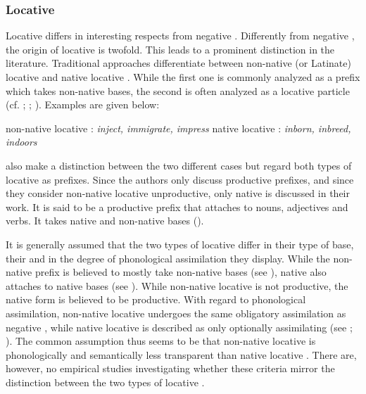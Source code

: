 \subsubsection{Locative } \label{locative in}

Locative  differs in interesting respects from negative . Differently from negative , the origin of locative  is twofold. This leads to a prominent distinction in the literature. Traditional approaches differentiate between non-native (or Latinate) locative  and native locative .  While the first one is commonly analyzed as a prefix which takes non-native bases, the second is often analyzed as a locative particle (cf. \citealt[497ff.]{Jespersen.1965}\mbox{;} \citealt[115, 163f.]{Marchand.1969}\mbox{;} \citealt[1685]{Bauer.2002}). Examples are given below:

\begin{exe}
	\ex non-native locative : \hspace{0.7cm} \textit{inject, immigrate, impress}
	\ex native locative : \hspace{1.4cm} \textit{inborn, inbreed, indoors}
\end{exe}

\cite{Bauer.2013} also make a distinction between the two different cases but regard both types of locative  as prefixes. Since the authors only discuss productive prefixes, and since they consider non-native locative  unproductive,  only native  is discussed in their work. It is said to be a productive prefix that attaches to nouns, adjectives and verbs. It takes native and non-native bases (\citealt[334, 340]{Bauer.2013}).
 
 It is generally assumed that the two types of locative  differ in their type of base, their  and in the degree of phonological assimilation they display. While the non-native prefix is believed to mostly take non-native bases (see \citealt[499]{Jespersen.1965}), native  also attaches to native bases (see \citealt[334]{Bauer.2013}). While non-native locative  is not productive, the native form is believed to be productive. With regard to phonological assimilation, non-native locative  undergoes the same obligatory assimilation as negative , while native locative  is described as only optionally assimilating (see \citealt[499]{Jespersen.1965}; \citealt[335]{Bauer.2013}). The common assumption thus seems to be that non-native locative  is phonologically and semantically less transparent than native locative . There are, however, no empirical studies investigating whether these criteria mirror the distinction between the two types of locative . 
 

